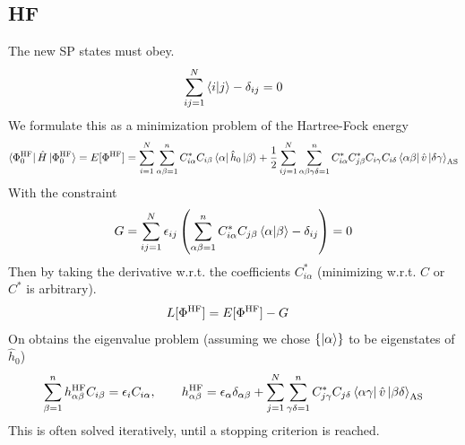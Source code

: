 \documentclass[
11pt,notheorems,hyperref={pdfauthor=whatever}
]{beamer}
\begin{document}
\subsection{HF}
\begin{frame}
    The new SP states must obey.
    \begin{align*}
        \sum_{ij=1}^{N} \braket{i|j} - \delta_{ij} = 0
    \end{align*}
    We formulate this as a minimization problem of the Hartree-Fock energy   
    \begin{align*}
        \bra{\Phi^{\text{HF}}_0}\hat{H}\ket{\Phi^{\text{HF}}_0} = E[\Phi^{\text{HF}}] = \sum_{i=1}^N \sum_{\alpha\beta=1}^n C^*_{i\alpha}C_{i\beta}\bra{\alpha}\hat{h}_0\ket{\beta} + \frac{1}{2}\sum_{ij=1}^N \sum_{\alpha\beta\gamma\delta=1}^n C^*_{i\alpha} C^*_{j\beta} C_{i\gamma} C_{i\delta} \bra{\alpha\beta}\hat{v}\ket{\delta\gamma}_{\text{AS}} 
    \end{align*}
    With the constraint 
    \begin{align*}
        G = \sum_{ij=1}^N  \epsilon_{ij}\left( \sum_{\alpha\beta=1}^n C^*_{i\alpha}C_{j\beta} \braket{\alpha|\beta} - \delta_{ij}\right) = 0
    \end{align*}
    Then by taking the derivative w.r.t. the coefficients $C^*_{i\alpha}$ (minimizing w.r.t. $C$ or $C^*$ is arbitrary).
    \begin{align*}
        L[\Phi^{\text{HF}}] &= E[\Phi^{\text{HF}}] - G
    \end{align*}
    On obtains the eigenvalue problem (assuming we chose $\{ \ket{\alpha} \}$ to be eigenstates of $\hat{h}_0$)
    \begin{align*}
        \sum_{\beta=1}^n \hatreefock{h}_{\alpha\beta} C_{i\beta} = \epsilon_i C_{i\alpha},\hspace{20px}
        \hatreefock{h}_{\alpha\beta} = \epsilon_\alpha \delta_{\alpha\beta} + \sum_{j=1}^{N} \sum_{\gamma\delta=1}^n C_{j\gamma}^* C_{j\delta} \innerAS{\alpha\gamma}{\hat{v}}{\beta\delta}
    \end{align*}
    This is often solved iteratively, until a stopping criterion is reached.
\end{frame}
\end{document}
